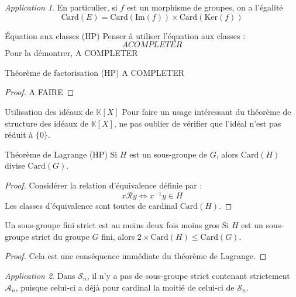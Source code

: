 \documentclass[french]{book}
\newcommand{\K}{\mathbb{K}}
\newcommand{\inv}{^{-1}}
\renewcommand{\ker}{\text{Ker}}
\newcommand{\im}{\text{Im}}
\newcommand{\card}{\text{Card}}
\theoremstyle{plain}
\theoremstyle{definition}
\theoremstyle{remark}
\newtheorem*{app}{Application}
\begin{document}
\begin{app}
	En particulier, si $f$ est un morphisme de groupes, on a l'égalité $$\card(E)=\card(\im(f))\times\card(\ker(f))$$
\end{app}
\begin{AS}{Équation aux classes (HP)} Penser à utiliser l'équation aux classes : $$A COMPLETER$$ Pour la démontrer, A COMPLETER
\end{AS}
\begin{AS}{Théorème de factorisation (HP)}
	A COMPLETER
\end{AS}
\begin{proof}
	A FAIRE
\end{proof}
\begin{AS}{Utilisation des idéaux de $\K[X]$} Pour faire un usage intéressant du théorème de structure des idéaux de $\K[X]$, ne pas oublier de vérifier que l’idéal n’est pas réduit à $\{0\}$.
\end{AS}
\begin{AS}{Théorème de Lagrange (HP)}
	Si $H$ est un sous-groupe de $G$, alors $\card(H)$ divise $\card(G)$.
\end{AS}
\begin{proof}
	Considérer la relation d'équivalence définie par : $$x\mathcal{R}y\iff x\inv y\in H$$ Les classes d'équivalence sont toutes de cardinal $\card(H)$. 
\end{proof}
\begin{AS}{Un sous-groupe fini strict est au moins deux fois moins gros} Si $H$ est un sous-groupe strict du groupe $G$ fini, alors $2\times\card(H)\leqslant\card(G)$.
\end{AS}
\begin{proof}
	Cela est une conséquence immédiate du théorème de Lagrange.
\end{proof}
\begin{app}
	Dans $\mathcal{S}_n$, il n'y a pas de sous-groupe strict contenant strictement $\mathcal{A}_n$, puisque celui-ci a déjà pour cardinal la moitié de celui-ci de $\mathcal{S}_n$.
\end{app}
\end{document}
